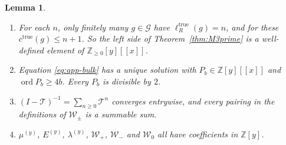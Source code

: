 \documentclass[11pt]{article}
\theoremstyle{plain}
\newtheorem{lemma}[theorem]{Lemma}
\theoremstyle{definition}
\theoremstyle{remark}
\begin{document}
\begin{lemma}\label{M3:lem:conv}
\begin{enumerate}
\item[(a)] For each $n$, only finitely many $g\in\mathcal G$ have $\ell_R^{\mathrm{true}}(g)=n$,
  and for these $c^{\mathrm{true}}(g)\le n+1$. So the left side of Theorem~\ref{thm:M3prime} is a
  well-defined element of $\mathbb Z_{\ge0}[y][[x]]$.
\item[(b)] Equation \eqref{eq:app-bulk} has a unique solution with $P_b\in\mathbb Z[y][[x]]$
  and $\operatorname{ord}P_b\ge4b$. Every $P_b$ is divisible by $2$.
\item[(c)] $(I-\mathcal T)^{-1}=\sum_{n\ge0}\mathcal T^n$ converges entrywise, and every pairing
  in the definitions of $\mathcal W_\pm$ is a summable sum.
\item[(d)] $\mu^{(y)}$, $E^{(y)}$, $\lambda^{(y)}$, $\mathcal W_+$, $\mathcal W_-$ and
  $\mathcal W_0$ all have coefficients in $\mathbb Z[y]$.
\end{enumerate}
\end{lemma}
\end{document}
